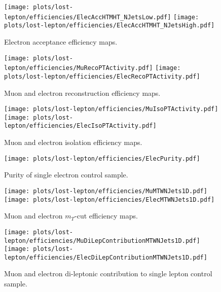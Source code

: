 \begin{figure}[h]
  \centering
  \texttt{[image: plots/lost-lepton/efficiencies/ElecAccHTMHT\_NJetsLow.pdf]}
  \texttt{[image: plots/lost-lepton/efficiencies/ElecAccHTMHT\_NJetsHigh.pdf]}
  \caption{Electron acceptance efficiency maps.}
  \label{fig:lost-lepton-acceptance-eff-elec}
\end{figure}

\begin{figure}[h]
  \centering
  \texttt{[image: plots/lost-lepton/efficiencies/MuRecoPTActivity.pdf]}
  \texttt{[image: plots/lost-lepton/efficiencies/ElecRecoPTActivity.pdf]}
  \caption{Muon and electron reconstruction efficiency maps.}
  \label{fig:lost-lepton-reconstruction-eff}
\end{figure}

\begin{figure}[h]
  \centering
  \texttt{[image: plots/lost-lepton/efficiencies/MuIsoPTActivity.pdf]}
  \texttt{[image: plots/lost-lepton/efficiencies/ElecIsoPTActivity.pdf]}
  \caption{Muon and electron isolation efficiency maps.}
  \label{fig:lost-lepton-isolation-eff}
\end{figure}

\begin{figure}[h]
  \centering
  \texttt{[image: plots/lost-lepton/efficiencies/ElecPurity.pdf]}
  \caption{Purity of single electron control sample.}
  \label{fig:lost-lepton-purity-eff}
\end{figure}

\begin{figure}[h]
  \centering
  \texttt{[image: plots/lost-lepton/efficiencies/MuMTWNJets1D.pdf]}
  \texttt{[image: plots/lost-lepton/efficiencies/ElecMTWNJets1D.pdf]}
  \caption{Muon and electron $m_T$-cut efficiency maps.}
  \label{fig:lost-lepton-mtcut-eff}
\end{figure}

\begin{figure}[h]
  \centering
  \texttt{[image: plots/lost-lepton/efficiencies/MuDiLepContributionMTWNJets1D.pdf]}
  \texttt{[image: plots/lost-lepton/efficiencies/ElecDiLepContributionMTWNJets1D.pdf]}
  \caption{Muon and electron di-leptonic contribution to single lepton control sample.}
  \label{fig:lost-lepton-dilepcontribution-eff}
\end{figure}

